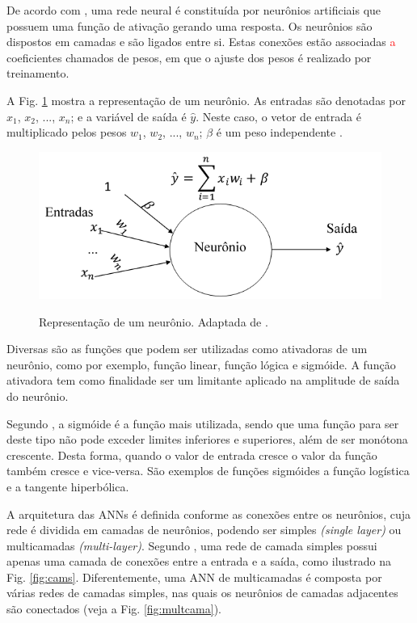 De acordo com , uma rede neural é constituída por neurônios artificiais que possuem uma função de ativação gerando uma resposta. Os neurônios são dispostos em camadas e são ligados entre si. Estas conexões estão associadas \textcolor{red}{a} coeficientes chamados de pesos, em que o ajuste dos pesos é realizado por treinamento. 

A Fig. \ref{fig:rd} mostra a representação de um neurônio. As entradas são denotadas por ${x}_1$, ${x}_2$, $...$, ${x}_n$; e a variável de saída é $\hat{y}$. Neste caso, o vetor de entrada é multiplicado pelos pesos ${w}_1$, ${w}_2$, $...$, ${w}_n$; $\beta$ é um peso independente \cite{sampaio2009,PINA2010}. \\

\begin{figure}[!htbp]
	\centering
	{\includegraphics[width=0.5\linewidth]{tatiane/fig_tati/redeneural/neuronio.png}}\caption{Representação de um neurônio. Adaptada de .} 
	\label{fig:rd}
\end{figure}

Diversas são as funções que podem ser utilizadas como ativadoras de um neurônio, como por exemplo, função linear, função lógica e sigmóide. A função ativadora tem como finalidade ser um limitante aplicado na amplitude de saída do neurônio.

Segundo , a sigmóide é a função mais utilizada, sendo que uma função para ser deste tipo não pode exceder limites inferiores e superiores, além de ser monótona crescente. Desta forma, quando o valor de entrada cresce o valor da função também cresce e vice-versa. São exemplos de funções sigmóides a função logística e a tangente hiperbólica.

A arquitetura das ANNs é definida conforme as conexões entre os neurônios, cuja rede é dividida em camadas de neurônios, podendo ser simples {\it (single layer)} ou multicamadas {\it (multi-layer)}. Segundo , uma rede de camada simples possui apenas uma camada de conexões entre a entrada e a saída, como ilustrado na Fig. \ref{fig:cams}. Diferentemente, uma ANN de multicamadas é composta por várias redes de camadas simples, nas quais os neurônios de camadas adjacentes são conectados (veja a Fig. \ref{fig:multcama}).

